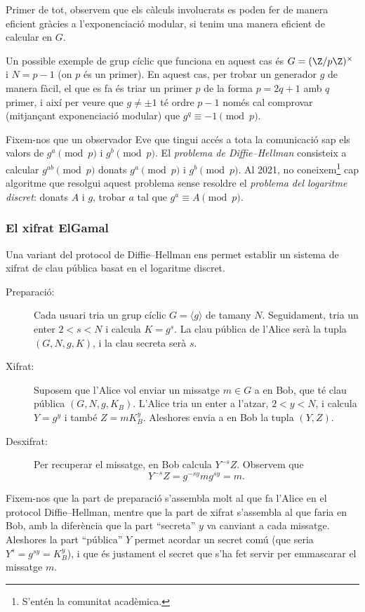 Primer de tot, observem que els càlculs involucrats es poden fer de manera eficient gràcies a l'exponenciació modular, si tenim una manera eficient de calcular en $G$.

Un possible exemple de grup cíclic que funciona en aquest cas és $G = (\Z/p\Z)^\times$ i $N=p-1$ (on $p$ és un primer). En aquest cas, per trobar un generador $g$ de manera fàcil, el que es fa és triar un primer $p$ de la forma $p=2q+1$ amb $q$ primer, i així per veure que $g\neq \pm 1$ té ordre $p-1$ només cal comprovar (mitjançant exponenciació modular) que $g^q\equiv -1\pmod{p}$.

Fixem-nos que un observador Eve que tingui accés a tota la comunicació sap els valors de $g^a\pmod{p}$ i $g^b\pmod{p}$. El \emph{problema de Diffie--Hellman} consisteix a calcular $g^{ab}\pmod{p}$ donats $g^a\pmod{p}$ i $g^b\pmod{p}$. Al 2021, no coneixem\footnote{S'entén la comunitat acadèmica.} cap algoritme que resolgui aquest problema sense resoldre el \emph{problema del logaritme discret}: donats $A$ i $g$, trobar $a$ tal que $g^a\equiv A\pmod{p}$.

 \subsubsection{El xifrat ElGamal}
 \label{sec:elgamal}
 
 Una variant del protocol de Diffie--Hellman ens permet establir un sistema de xifrat de clau pública basat en el logaritme discret. 
 
 \begin{description}
 \item[Preparació:] Cada usuari tria un grup cíclic $G=\langle g \rangle$ de tamany $N$. Seguidament, tria un enter $2< s < N$ i calcula $K=g^s$. La clau pública de l'Alice serà la tupla $(G, N, g, K)$, i la clau secreta serà $s$.
 \item[Xifrat:] Suposem que l'Alice vol enviar un missatge $m\in G$ a en Bob, que té clau pública $(G, N, g, K_B)$. L'Alice tria un enter a l'atzar, $2< y < N$, i calcula $Y=g^y$ i també $Z=mK_B^y$. Aleshores envia a en Bob la tupla $(Y,Z)$.
 \item[Desxifrat:] Per recuperar el missatge, en Bob calcula $Y^{-s} Z$. Observem que
 \[
 Y^{-s}Z = g^{-sy}mg^{sy} = m.
 \]
 \end{description}
 Fixem-nos que la part de preparació s'assembla molt al que fa l'Alice en el protocol Diffie--Hellman, mentre que la part de xifrat s'assembla al que faria en Bob, amb la diferència que la part ``secreta'' $y$ va canviant a cada missatge. Aleshores la part ``pública'' $Y$ permet acordar un secret comú (que seria $Y^s=g^{sy}=K_B^y$), i que és justament el secret que s'ha fet servir per emmascarar el missatge $m$.
 
